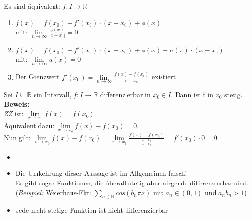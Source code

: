 \setcounter{Satz}{1} 
\setcounter{Definition}{5}

\begin{Satz}{
	Es sind äquivalent: $f : I \rightarrow \mathbb{R}$
	\begin{enumerate}
		\item $f(x) = f(x_0) + f'(x_0) \cdot (x-x_0) + \phi(x) $\\
		 mit: $\lim\limits_{n \rightarrow \infty}{\frac{\phi(x)}{|x-x_0|}} = 0$
	\item $ f(x) = f(x_0) + f'(x_0) \cdot (x-x_0) + \phi(x) + u(x)  \cdot (x-x_0)$ \\
	mit: $\lim\limits_{n \rightarrow \infty}{u(x)} = 0$
	\item Der Grenzwert 
	$f'(x_0) = \lim\limits_{n \rightarrow \infty}{\frac{f(x)-f(x_0)}{x-x_0}}$ 	
	existiert
	\end{enumerate}
}\end{Satz}

\begin{Satz}{\label{satz:satz_3}
	Sei $ I \subseteq \mathbb{R}$ ein Intervall, $f: I \rightarrow \mathbb{R}$ 
	differenzierbar in $x_0 \in I$. Dann ist f in $x_0$ stetig. \\
	\textbf{Beweis:} \\
		\noindent\hspace*{5mm}
		\textit{ZZ}  ist: $\lim\limits_{x \rightarrow x_0}{f(x) = f(x_0)}$ \\
		\noindent\hspace*{10mm}
		Äquivalent dazu: $\lim\limits_{x \rightarrow x_0}{f(x)-f(x_0) = 0}$. \\
		\noindent\hspace*{10mm}
		Nun gilt: $\lim\limits_{x \rightarrow x_0}{f(x) - f(x_0)} = 
	 \lim\limits_{x \rightarrow x_0}{\frac{f(x)-f(x_0)}{\frac{x-x_0}{x-x_0}}}
	 = f'(x_0) \cdot 0 = 0 $
}\end{Satz}
\begin{Bemerkung}{
	 \begin{itemize}
	 	\item[ ]
	 	\item Die Umkehrung dieser Aussage ist im Allgemeinen falsch! \\
	 	Es gibt sogar Funktionen, die überall stetig aber nirgends 
	 	differenzierbar sind. \\
	 	(\textit{Beispiel:} Weierhaus-Fkt: $\sum_{n \in \mathbb{N}} cos(b_n \pi x)$
	 	mit $a_n \in (0,1)$ und $a_n b_n >1$)
	 	\item Jede nicht stetige Funktion ist nicht differenzierbar
	 \end{itemize}	 
}\end{Bemerkung}

